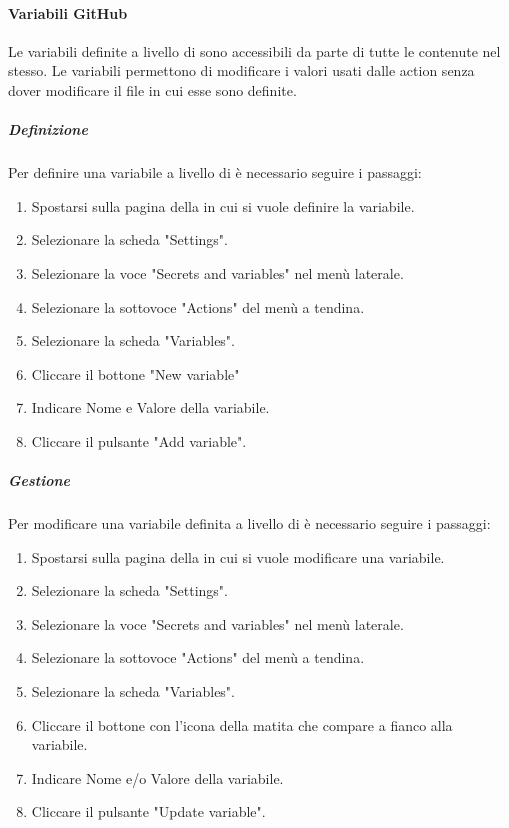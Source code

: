 \paragraph{Variabili GitHub}
Le variabili definite a livello di  sono accessibili da parte di tutte le  contenute nel  stesso.
Le variabili permettono di modificare i valori usati dalle action senza dover modificare il file in cui esse sono definite.

\subparagraph{Definizione}
Per definire una variabile a livello di  è necessario seguire i passaggi:
\begin{enumerate}
    \item Spostarsi sulla pagina della  in cui si vuole definire la variabile.
    \item Selezionare la scheda "Settings".
    \item Selezionare la voce "Secrets and variables" nel menù laterale.
    \item Selezionare la sottovoce "Actions" del menù a tendina.
    \item Selezionare la scheda "Variables".
    \item Cliccare il bottone "New  variable" 
    \item Indicare Nome e Valore della variabile.
    \item Cliccare il pulsante "Add variable".
\end{enumerate}

\subparagraph{Gestione}
Per modificare una variabile definita a livello di  è necessario seguire i passaggi:
\begin{enumerate}
    \item Spostarsi sulla pagina della  in cui si vuole modificare una variabile.
    \item Selezionare la scheda "Settings".
    \item Selezionare la voce "Secrets and variables" nel menù laterale.
    \item Selezionare la sottovoce "Actions" del menù a tendina.
    \item Selezionare la scheda "Variables".
    \item Cliccare il bottone con l'icona della matita che compare a fianco alla variabile.
    \item Indicare Nome e/o Valore della variabile.
    \item Cliccare il pulsante "Update variable".
\end{enumerate}

